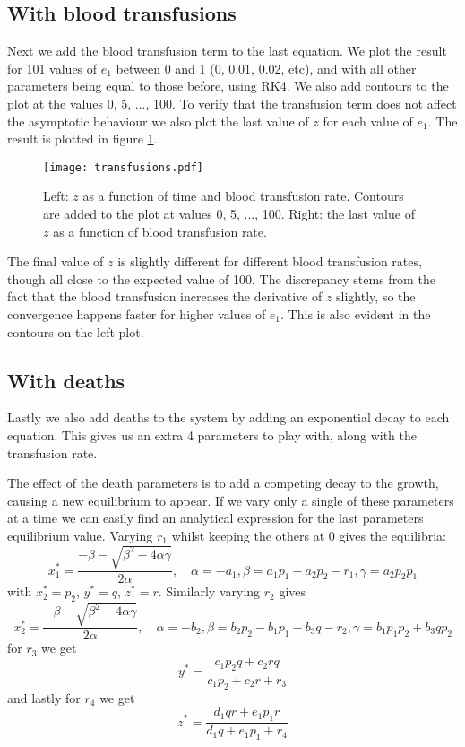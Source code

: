 \documentclass[a4paper,10pt]{article}
\begin{document}
	\subsection*{With blood transfusions}
	Next we add the blood transfusion term to the last equation. We plot the result for 101 values of $ e_1 $ between 0 and 1 (0, 0.01, 0.02, etc), and with all other parameters being equal to those before, using RK4. We also add contours to the plot at the values 0, 5, ..., 100. To verify that the transfusion term does not affect the asymptotic behaviour we also plot the last value of $ z $ for each value of $ e_1 $. The result is plotted in figure \ref{fig:transfusions}. 
	\begin{figure}[H]
		\centering
		\texttt{[image: transfusions.pdf]}
		\caption{Left: $ z $ as a function of time and blood transfusion rate. Contours are added to the plot at values 0, 5, ..., 100. Right: the last value of $ z $ as a function of blood transfusion rate.}
		\label{fig:transfusions}
	\end{figure}
	The final value of $ z $ is slightly different for different blood transfusion rates, though all close to the expected value of 100. The discrepancy stems from the fact that the blood transfusion increases the derivative of $ z $ slightly, so the convergence happens faster for higher values of $ e_1 $. This is also evident in the contours on the left plot.
	
	\subsection*{With deaths}
	Lastly we also add deaths to the system by adding an exponential decay to each equation. This gives us an extra 4 parameters to play with, along with the transfusion rate.
	
	The effect of the death parameters is to add a competing decay to the growth, causing a new equilibrium to appear. If we vary only a single of these parameters at a time we can easily find an analytical expression for the last parameters equilibrium value. Varying $ r_1 $ whilst keeping the others at 0 gives the equilibria:
	\begin{equation}\label{key}
		x_1^* = \frac{-\beta - \sqrt{\beta^2 - 4\alpha \gamma}}{2 \alpha}, \quad \alpha=-a_1, \beta = a_1p_1-a_2p_2-r_1, \gamma =a_2p_2p_1
	\end{equation}
	with $ x_2^* = p_2 $, $ y^* = q $, $ z^* = r $. Similarly varying $ r_2 $ gives
	\begin{equation}\label{key}
		x_2^* = \frac{-\beta - \sqrt{\beta^2 - 4\alpha \gamma}}{2 \alpha}, \quad \alpha=-b_2, \beta = b_2p_2-b_1p_1-b_3q-r_2, \gamma =b_1p_1p_2 + b_3qp_2
	\end{equation}
	for $ r_3 $ we get
	\begin{equation}\label{key}
		y^* = \frac{c_1p_2q+c_2rq}{c_1p_2 + c_2r+r_3}
	\end{equation}
	and lastly for $ r_4 $ we get
	\begin{equation}\label{key}
		z^* = \frac{d_1 q r + e_1p_1r}{d_1q+e_1p_1+r_4}
	\end{equation}
	
\end{document}
